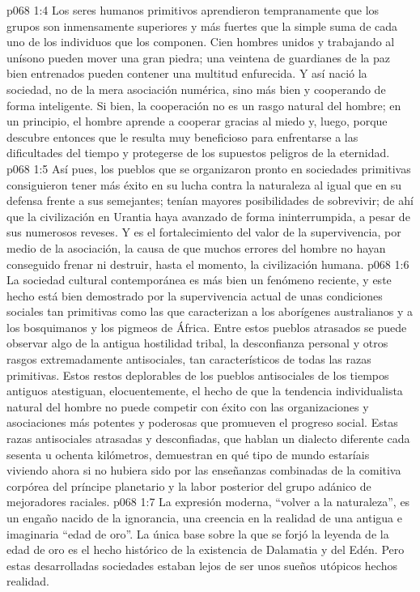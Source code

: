 \vs p068 1:4 \pc Los seres humanos primitivos aprendieron tempranamente que los grupos son inmensamente superiores y más fuertes que la simple suma de cada uno de los individuos que los componen. Cien hombres unidos y trabajando al unísono pueden mover una gran piedra; una veintena de guardianes de la paz bien entrenados pueden contener una multitud enfurecida. Y así nació la sociedad, no de la mera asociación numérica, sino más bien  y cooperando de forma inteligente. Si bien, la cooperación no es un rasgo natural del hombre; en un principio, el hombre aprende a cooperar gracias al miedo y, luego, porque descubre entonces que le resulta muy beneficioso para enfrentarse a las dificultades del tiempo y protegerse de los supuestos peligros de la eternidad.
\vs p068 1:5 Así pues, los pueblos que se organizaron pronto en sociedades primitivas consiguieron tener más éxito en su lucha contra la naturaleza al igual que en su defensa frente a sus semejantes; tenían mayores posibilidades de sobrevivir; de ahí que la civilización en Urantia haya avanzado de forma ininterrumpida, a pesar de sus numerosos reveses. Y es el fortalecimiento del valor de la supervivencia, por medio de la asociación, la causa de que muchos errores del hombre no hayan conseguido frenar ni destruir, hasta el momento, la civilización humana.
\vs p068 1:6 \pc La sociedad cultural contemporánea es más bien un fenómeno reciente, y este hecho está bien demostrado por la supervivencia actual de unas condiciones sociales tan primitivas como las que caracterizan a los aborígenes australianos y a los bosquimanos y los pigmeos de África. Entre estos pueblos atrasados se puede observar algo de la antigua hostilidad tribal, la desconfianza personal y otros rasgos extremadamente antisociales, tan característicos de todas las razas primitivas. Estos restos deplorables de los pueblos antisociales de los tiempos antiguos atestiguan, elocuentemente, el hecho de que la tendencia individualista natural del hombre no puede competir con éxito con las organizaciones y asociaciones más potentes y poderosas que promueven el progreso social. Estas razas antisociales atrasadas y desconfiadas, que hablan un dialecto diferente cada sesenta u ochenta kilómetros, demuestran en qué tipo de mundo estaríais viviendo ahora si no hubiera sido por las enseñanzas combinadas de la comitiva corpórea del príncipe planetario y la labor posterior del grupo adánico de mejoradores raciales.
\vs p068 1:7 La expresión moderna, “volver a la naturaleza”, es un engaño nacido de la ignorancia, una creencia en la realidad de una antigua e imaginaria “edad de oro”. La única base sobre la que se forjó la leyenda de la edad de oro es el hecho histórico de la existencia de Dalamatia y del Edén. Pero estas desarrolladas sociedades estaban lejos de ser unos sueños utópicos hechos realidad.
